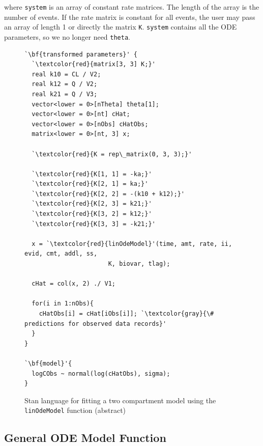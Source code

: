 \documentclass[11pt]{amsart}
\newenvironment{fmpage}[1]
     {\begin{lrbox}{\fmbox}\begin{minipage}{#1}}
     {\end{minipage}\end{lrbox}\fbox{\usebox{\fmbox}}}
\begin{document}
where \texttt{system} is an array of constant rate matrices. The length of the array is the number of events. If the rate matrix is constant for all events, the user may pass an array of length 1 or directly the matrix \texttt{K}.  \texttt{system} contains all the ODE parameters, so we no longer need \texttt{theta}.

\begin{figure}[!htb]
\caption{Stan language for fitting a two compartment model using the \texttt{linOdeModel} function (abstract)}
\begin{center}
\begin{small}
\begin{fmpage}{\textwidth - .75in}
\begin{lstlisting}[basicstyle=\footnotesize\ttfamily,mathescape=true,flexiblecolumns=true,frame=single,escapeinside=`']
`\bf{transformed parameters}' {
  `\textcolor{red}{matrix[3, 3] K;}'
  real k10 = CL / V2;
  real k12 = Q / V2;
  real k21 = Q / V3;
  vector<lower = 0>[nTheta] theta[1];
  vector<lower = 0>[nt] cHat;
  vector<lower = 0>[nObs] cHatObs;
  matrix<lower = 0>[nt, 3] x;
 
  `\textcolor{red}{K = rep\_matrix(0, 3, 3);}'

  `\textcolor{red}{K[1, 1] = -ka;}'  
  `\textcolor{red}{K[2, 1] = ka;}' 
  `\textcolor{red}{K[2, 2] = -(k10 + k12);}' 
  `\textcolor{red}{K[2, 3] = k21;}' 
  `\textcolor{red}{K[3, 2] = k12;}' 
  `\textcolor{red}{K[3, 3] = -k21;}'

  x = `\textcolor{red}{linOdeModel}'(time, amt, rate, ii, evid, cmt, addl, ss,
                       K, biovar, tlag);

  cHat = col(x, 2) ./ V1;

  for(i in 1:nObs){
    cHatObs[i] = cHat[iObs[i]]; `\textcolor{gray}{\# predictions for observed data records}'
  }
}

`\bf{model}'{
  logCObs ~ normal(log(cHatObs), sigma);
}
\end{lstlisting}
\end{fmpage}
\end{small}
\end{center}
\label{LinTwoCptCode}
\end{figure}

\subsection{General ODE Model Function} \ \\
\end{document}
